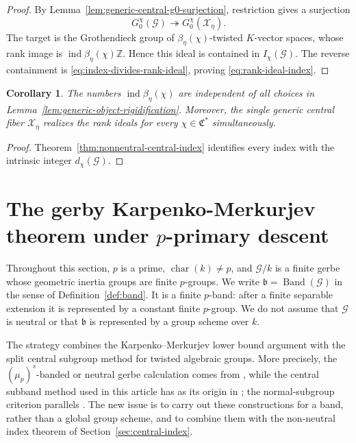 \documentclass[11pt,reqno]{amsart}
\numberwithin{equation}{section}
\theoremstyle{plain}
\newtheorem{coro}[prop]{Corollary}
\theoremstyle{definition}
\def\cG{{\mathcal G}}
\def\cX{{\mathcal X}}
\def\fC{{\mathfrak C}}
\def\ind{{\operatorname{ind}}}
\def\band{{\mathfrak b}}
\begin{document}
\begin{proof}
By Lemma~\ref{lem:generic-central-g0-surjection}, restriction gives a
surjection
\[
G_0^\chi(\cG)\twoheadrightarrow G_0^\chi(\cX_\eta).
\]
The target is the Grothendieck group of
$\beta_\eta(\chi)$-twisted $K$-vector spaces, whose rank image is
$\ind\beta_\eta(\chi)\mathbb Z$.  Hence this ideal is contained in
$I_\chi(\cG)$.  The reverse containment is
\eqref{eq:index-divides-rank-ideal}, proving
\eqref{eq:rank-ideal-index}.
\end{proof}

\begin{coro}
\label{cor:independence-central-index}
The numbers $\ind\beta_\eta(\chi)$ are independent of all choices in
Lemma~\ref{lem:generic-object-rigidification}.  Moreover, the single generic central fiber $\cX_\eta$ realizes the
rank ideals for every $\chi\in\fC^*$ simultaneously.
\end{coro}

\begin{proof}
Theorem~\ref{thm:nonneutral-central-index} identifies every index with the
intrinsic integer $d_\chi(\cG)$.
\end{proof}

\section{The gerby Karpenko-Merkurjev theorem under \texorpdfstring{$p$}{p}-primary descent}
\label{sec:gerby-km}

Throughout this section, $p$ is a prime, $\operatorname{char}(k)\ne p$,
and $\cG/k$ is a finite gerbe whose geometric inertia groups are finite
$p$-groups.  We write
$\band=\operatorname{Band}(\cG)$ in the sense of
Definition~\ref{def:band}.  It is a finite $p$-band:
after a finite separable extension it is represented by a constant finite
$p$-group.  We do not assume that $\cG$ is neutral or that $\band$
is represented by a group scheme over $k$.

The strategy combines the Karpenko--Merkurjev lower bound argument with
the split central subgroup method for twisted algebraic groups. More
precisely, the $(\mu_p)^s$-banded or neutral gerbe calculation comes from
\cite[Theorems~2.1 and~3.1]{KM}, while the central subband method used in this article has as its origin in
\cite[Definition~4.2]{LMMRTori}; the normal-subgroup criterion parallels
\cite[Lemma~2.1, Theorem~7.1]{LMMRTori}. The new issue is
to carry out these constructions for a band, rather than a global group
scheme, and to combine them with the non-neutral index theorem of
Section~\ref{sec:central-index}.
\end{document}
